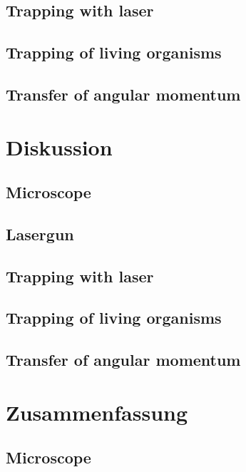 \documentclass[12pt,english,ngerman]{scrartcl}
\begin{document}
\subsection{Trapping with laser}


\subsection{Trapping of living organisms}


\subsection{Transfer of angular momentum}





\section{Diskussion}\label{sec:diskussion}

\subsection{Microscope}

\subsection{Lasergun}


\subsection{Trapping with laser}


\subsection{Trapping of living organisms}


\subsection{Transfer of angular momentum}






\section{Zusammenfassung}\label{sec:zusammenfassung}

\subsection{Microscope}
\end{document}
